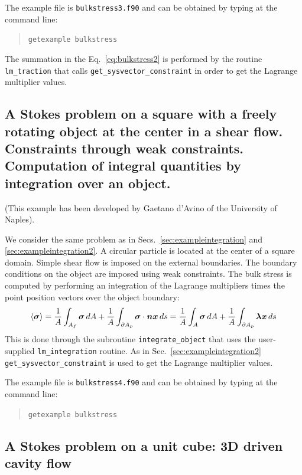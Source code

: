The example file is \texttt{bulkstress3.f90} and can be obtained by typing at the
command line:
\begin{quote}
   \texttt{getexample bulkstress}
\end{quote}
The summation in the Eq.~\eqref{eq:bulkstress2} is performed by the
routine \texttt{lm\_traction} that calls
\texttt{get\_sysvector\_constraint} in order to get the Lagrange multiplier
values.

\subsection{A Stokes problem on a square with a freely rotating object at the
center in a shear flow. Constraints through weak constraints.
Computation of integral quantities by integration over an object.}

(This example has been developed by Gaetano d'Avino of the University of Naples).

We consider the same problem as in Secs.~\ref{sec:exampleintegration} and
\ref{sec:exampleintegration2}.
A circular particle is located at the center of a
square domain. Simple shear flow is imposed on the external boundaries. The
boundary conditions on the object are imposed using weak
constraints. The bulk stress
is computed by performing an integration of the Lagrange
multipliers times the point position vectors over the object boundary:
\begin{equation}
\langle\boldsymbol{\sigma}\rangle=
\frac{1}{A}\int_{A_{f}}\boldsymbol{\sigma}\,d A+\frac{1}{A}\int_{\partial
A_{p}}\boldsymbol{\sigma}\cdot\boldsymbol{n}\boldsymbol{x}\,d s=
\frac{1}{A}\int_{A}\boldsymbol{\sigma}\,d A+
\frac{1}{A}\int_{\partial A_{p}}\boldsymbol{\lambda}\boldsymbol{x}\,d s
\label{eq:bulkstress3}
\end{equation}
This is
done through the subroutine \texttt{integrate\_object} that uses
the user-supplied \texttt{lm\_integration} routine. As in
Sec.~\ref{sec:exampleintegration2} \texttt{get\_sysvector\_constraint} is used
to get the Lagrange multiplier values.

The example file is \texttt{bulkstress4.f90} and can be obtained by typing at the
command line:
\begin{quote}
   \texttt{getexample bulkstress}
\end{quote}

\subsection{A Stokes problem on a unit cube: 3D driven cavity flow}
\label{sec:stokes3Ddrivencavity}

